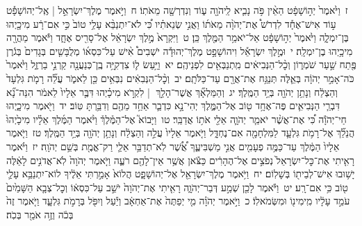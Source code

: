\documentclass[18pt]{article}
\newcommand{\kri}[1]{\Afootnote{#1}}	%
\begin{document}
 {\loc ז~}וַיֹּ֙אמֶר֙ יְה֣וֹשָׁפָ֔ט הַאֵ֨ין פֹּ֥ה נָבִ֛יא לַֽיהֹוָ֖ה ע֑וֹד וְנִדְרְשָׁ֖ה מֵאֹתֽוֹ׃ \startlock
 {\loc ח~}וַיֹּ֣אמֶר מֶלֶךְ־יִשְׂרָאֵ֣ל  |  אֶֽל־יְהוֹשָׁפָ֡ט ע֣וֹד אִישׁ־אֶחָ֡ד לִדְרֹשׁ֩ אֶת־יְהֹוָ֨ה מֵאֹת֜וֹ וַאֲנִ֣י שְׂנֵאתִ֗יו כִּ֠י לֹא־יִתְנַבֵּ֨א עָלַ֥י טוֹב֙ כִּ֣י אִם־רָ֔ע מִיכָ֖יְהוּ בֶּן־יִמְלָ֑ה וַיֹּ֙אמֶר֙ יְה֣וֹשָׁפָ֔ט אַל־יֹאמַ֥ר הַמֶּ֖לֶךְ כֵּֽן׃ \startlock
 {\loc ט~}וַיִּקְרָא֙ מֶ֣לֶךְ יִשְׂרָאֵ֔ל אֶל־סָרִ֖יס אֶחָ֑ד וַיֹּ֕אמֶר מַהֲרָ֖ה מִיכָ֥יְהוּ בֶן־יִמְלָֽה׃ \startlock
 {\loc י~}וּמֶ֣לֶךְ יִשְׂרָאֵ֡ל וִיהוֹשָׁפָ֣ט מֶלֶךְ־יְהוּדָ֡ה יֹשְׁבִים֩ אִ֨ישׁ עַל־כִּסְא֜וֹ מְלֻבָּשִׁ֤ים בְּגָדִים֙ בְּגֹ֔רֶן פֶּ֖תַח שַׁ֣עַר שֹׁמְר֑וֹן וְכׇ֨ל־הַנְּבִיאִ֔ים מִֽתְנַבְּאִ֖ים לִפְנֵיהֶֽם׃ \startlock
 {\loc יא~}וַיַּ֥עַשׂ ל֛וֹ צִדְקִיָּ֥ה בֶֽן־כְּנַעֲנָ֖ה קַרְנֵ֣י בַרְזֶ֑ל וַיֹּ֙אמֶר֙ כֹּה־אָמַ֣ר יְהֹוָ֔ה בְּאֵ֛לֶּה תְּנַגַּ֥ח אֶת־אֲרָ֖ם עַד־כַּלֹּתָֽם׃ \startlock
 {\loc יב~}וְכׇ֨ל־הַנְּבִאִ֔ים נִבְּאִ֥ים כֵּ֖ן לֵאמֹ֑ר עֲלֵ֞ה רָמֹ֤ת גִּלְעָד֙ וְהַצְלַ֔ח וְנָתַ֥ן יְהֹוָ֖ה בְּיַ֥ד הַמֶּֽלֶךְ׃ \startlock
 {\loc יג~}וְהַמַּלְאָ֞ךְ אֲשֶׁר־הָלַ֣ךְ  |  לִקְרֹ֣א מִיכָ֗יְהוּ דִּבֶּ֤ר אֵלָיו֙ לֵאמֹ֔ר הִנֵּה־נָ֞א דִּבְרֵ֧י הַנְּבִיאִ֛ים פֶּה־אֶחָ֥ד ט֖וֹב אֶל־הַמֶּ֑לֶךְ יְהִי־נָ֣א  \edtext{(דבריך)}{\kri{קרי: דְבָרְךָ֗}}  כִּדְבַ֛ר אַחַ֥ד מֵהֶ֖ם וְדִבַּ֥רְתָּ טּֽוֹב׃ \startlock
 {\loc יד~}וַיֹּ֖אמֶר מִיכָ֑יְהוּ חַי־יְהֹוָ֕ה כִּ֠י אֶת־אֲשֶׁ֨ר יֹאמַ֧ר יְהֹוָ֛ה אֵלַ֖י אֹת֥וֹ אֲדַבֵּֽר׃ \startlock
 {\loc טו~}וַיָּבוֹא֮ אֶל־הַמֶּ֒לֶךְ֒ וַיֹּ֨אמֶר הַמֶּ֜לֶךְ אֵלָ֗יו מִיכָ֙יְהוּ֙ הֲנֵלֵ֞ךְ אֶל־רָמֹ֥ת גִּלְעָ֛ד לַמִּלְחָמָ֖ה אִם־נֶחְדָּ֑ל וַיֹּ֤אמֶר אֵלָיו֙ עֲלֵ֣ה וְהַצְלַ֔ח וְנָתַ֥ן יְהֹוָ֖ה בְּיַ֥ד הַמֶּֽלֶךְ׃ \startlock
 {\loc טז~}וַיֹּ֤אמֶר אֵלָיו֙ הַמֶּ֔לֶךְ עַד־כַּמֶּ֥ה פְעָמִ֖ים אֲנִ֣י מַשְׁבִּיעֶ֑ךָ אֲ֠שֶׁ֠ר לֹֽא־תְדַבֵּ֥ר אֵלַ֛י רַק־אֱמֶ֖ת בְּשֵׁ֥ם יְהֹוָֽה׃ \startlock
 {\loc יז~}וַיֹּ֗אמֶר רָאִ֤יתִי אֶת־כׇּל־יִשְׂרָאֵל֙ נְפֹצִ֣ים אֶל־הֶהָרִ֔ים כַּצֹּ֕אן אֲשֶׁ֥ר אֵין־לָהֶ֖ם רֹעֶ֑ה וַיֹּ֤אמֶר יְהֹוָה֙ לֹֽא־אֲדֹנִ֣ים לָאֵ֔לֶּה יָשׁ֥וּבוּ אִישׁ־לְבֵית֖וֹ בְּשָׁלֽוֹם׃ \startlock
 {\loc יח~}וַיֹּ֥אמֶר מֶלֶךְ־יִשְׂרָאֵ֖ל אֶל־יְהוֹשָׁפָ֑ט הֲלוֹא֙ אָמַ֣רְתִּי אֵלֶ֔יךָ לוֹא־יִתְנַבֵּ֥א עָלַ֛י ט֖וֹב כִּ֥י אִם־רָֽע׃ \startlock
 {\loc יט~}וַיֹּ֕אמֶר לָכֵ֖ן שְׁמַ֣ע דְּבַר־יְהֹוָ֑ה רָאִ֤יתִי אֶת־יְהֹוָה֙ יֹשֵׁ֣ב עַל־כִּסְא֔וֹ וְכׇל־צְבָ֤א הַשָּׁמַ֙יִם֙ עֹמֵ֣ד עָלָ֔יו מִֽימִינ֖וֹ וּמִשְּׂמֹאלֽוֹ׃ \startlock
 {\loc כ~}וַיֹּ֣אמֶר יְהֹוָ֗ה מִ֤י יְפַתֶּה֙ אֶת־אַחְאָ֔ב וְיַ֕עַל וְיִפֹּ֖ל בְּרָמֹ֣ת גִּלְעָ֑ד וַיֹּ֤אמֶר זֶה֙ בְּכֹ֔ה וְזֶ֥ה אֹמֵ֖ר בְּכֹֽה׃ \startlock
\end{document}

